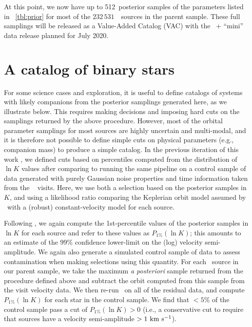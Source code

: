 \documentclass[modern]{aastex63}
\newcommand{\nsources}{\ensuremath{232\,531}}
\newcommand{\Kminval}{512}
\begin{document}
At this point, we now have up to \Kminval\ posterior samples of the parameters
listed in \tablename~\ref{tbl:prior} for most of the \nsources\ \apogee\ sources
in the parent sample.
These full samplings will be released as a Value-Added Catalog (VAC) with the
\sdss\ + ``mini'' data release planned for July 2020.


\section{A catalog of binary stars} \label{sec:catalog}

For some science cases and exploration, it is useful to define catalogs of
systems with likely companions from the posterior samplings generated here, as
we illustrate below.
This requires making decisions and imposing hard cuts on the samplings returned
by the above procedure.
However, most of the orbital parameter samplings for most sources are highly
uncertain and multi-modal, and it is therefore not possible to define simple
cuts on physical parameters (e.g., companion mass) to produce a simple catalog.
In the previous iteration of this work \citep{Price-Whelan:2018}, we defined
cuts based on percentiles computed from the distribution of $\ln K$ values after
comparing to running the same pipeline on a control sample of data generated
with purely Gaussian noise properties and time information taken from the
\apogee\  visits.
Here, we use both a selection based on the posterior samples in $K$, and using
a likelihood ratio comparing the Keplerian orbit model assumed by \thejoker\
with a (robust) constant-velocity model for each source.

Following \citet{Price-Whelan:2018}, we again compute the 1st-percentile values
of the posterior samples in $\ln K$ for each source and refer to these values as
$P_{1\%}(\ln K)$;
this amounts to an estimate of the 99\% confidence lower-limit on the (log)
velocity semi-amplitude.
We again also generate a simulated control sample of data to assess
contamination when making selections using this quantity.
For each \apogee\ source in our parent sample, we take the maximum \textsl{a
posteriori} sample returned from the procedure defined above and subtract the
orbit computed from this sample from the visit velocity data.
We then re-run \thejoker\ on all of the residual data, and compute $P_{1\%}(\ln
K)$ for each star in the control sample.
We find that $<5\%$ of the control sample pass a cut of $P_{1\%}(\ln K) > 0$
(i.e., a conservative cut to require that sources have a velocity semi-amplitude
$> 1~\mathrm{km}~\mathrm{s}^{-1}$).
\end{document}
